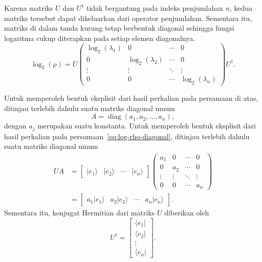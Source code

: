 Karena matriks $U$ dan $U^\dagger$ tidak bergantung pada indeks penjumlahan $n$, kedua matriks tersebut dapat dikeluarkan dari operator penjumlahan. Sementara itu, matriks di dalam tanda kurung tetap berbentuk diagonal sehingga fungsi logaritma cukup diterapkan pada setiap elemen diagonalnya.
\begin{equation}
\label{eq:log-rho-diagonal}
\log_2(\rho)
=
U
\begin{pmatrix}
\log_2(\lambda_1)&0&\cdots&0\\
0&\log_2(\lambda_2)&\cdots&0\\
\vdots&\vdots&\ddots&\vdots\\
0&0&\cdots&\log_2(\lambda_n)
\end{pmatrix}
U^\dagger.
\end{equation}

Untuk memperoleh bentuk eksplisit dari hasil perkalian pada persamaan di atas, ditinjau terlebih dahulu suatu matriks diagonal umum
\begin{equation}
A=
\operatorname{diag}
(a_1,a_2,\ldots,a_n),
\end{equation}
dengan $a_j$ merupakan suatu konstanta. Untuk memperoleh bentuk eksplisit dari hasil perkalian pada persamaan~\eqref{eq:log-rho-diagonal}, ditinjau terlebih dahulu suatu matriks diagonal umum
\begin{equation}
\begin{split}
UA
&=
\begin{bmatrix}
|e_1\rangle&
|e_2\rangle&
\cdots&
|e_n\rangle
\end{bmatrix}
\begin{pmatrix}
a_1&0&\cdots&0\\
0&a_2&\cdots&0\\
\vdots&\vdots&\ddots&\vdots\\
0&0&\cdots&a_n
\end{pmatrix}
\\
&=
\begin{bmatrix}
a_1|e_1\rangle&
a_2|e_2\rangle&
\cdots&
a_n|e_n\rangle
\end{bmatrix}.
\end{split}
\end{equation}
Sementara itu, konjugat Hermitian dari matriks $U$ diberikan oleh
\begin{equation}
U^\dagger=
\begin{bmatrix}
\langle e_1|\\
\langle e_2|\\
\vdots\\
\langle e_n|
\end{bmatrix}.
\end{equation}
